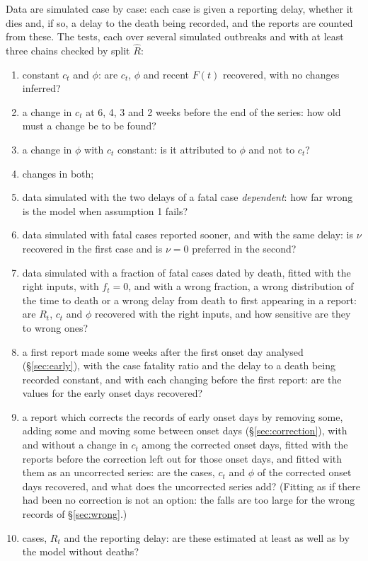 \documentclass[11pt,a4paper]{article}
\begin{document}
Data are simulated case by case: each case is given a reporting delay,
whether it dies and, if so, a delay to the death being recorded, and the
reports are counted from these. The tests, each over several simulated
outbreaks and with at least three chains checked by split $\hat{R}$:
\begin{enumerate}
\item constant $c_t$ and $\phi$: are $c_t$, $\phi$ and recent $F(t)$
recovered, with no changes inferred?
\item a change in $c_t$ at 6, 4, 3 and 2 weeks before the end of the series:
how old must a change be to be found?
\item a change in $\phi$ with $c_t$ constant: is it attributed to $\phi$ and
not to $c_t$?
\item changes in both;
\item data simulated with the two delays of a fatal case \emph{dependent}:
how far wrong is the model when assumption 1 fails?
\item data simulated with fatal cases reported sooner, and with the same
delay: is $\nu$ recovered in the first case and is $\nu=0$ preferred in the
second?
\item data simulated with a fraction of fatal cases dated by death, fitted with the right inputs, with $f_t=0$, and with a wrong
fraction, a wrong distribution of the time to death or a wrong delay from
death to first appearing in a report: are $R_t$, $c_t$ and
$\phi$ recovered with the right inputs, and how sensitive are they to wrong
ones?
\item a first report made some weeks after the first onset day analysed
(\S\ref{sec:early}), with the case fatality ratio and the delay to a death
being recorded constant, and with each changing before the first report:
are the values for the early onset days recovered?
\item a report which corrects the records of early onset days by removing
some, adding some and moving some between onset days
(\S\ref{sec:correction}), with and without a change in $c_t$ among the
corrected onset days, fitted with the reports before the correction left
out for those onset days, and fitted with them as an uncorrected series:
are the cases, $c_t$ and $\phi$ of the corrected onset days recovered, and
what does the uncorrected series add? (Fitting as if there had been no correction is not
an option: the falls are too large for the wrong records of
\S\ref{sec:wrong}.)
\item cases, $R_t$ and the reporting delay: are these estimated at least as
well as by the model without deaths?
\end{enumerate}
\end{document}
